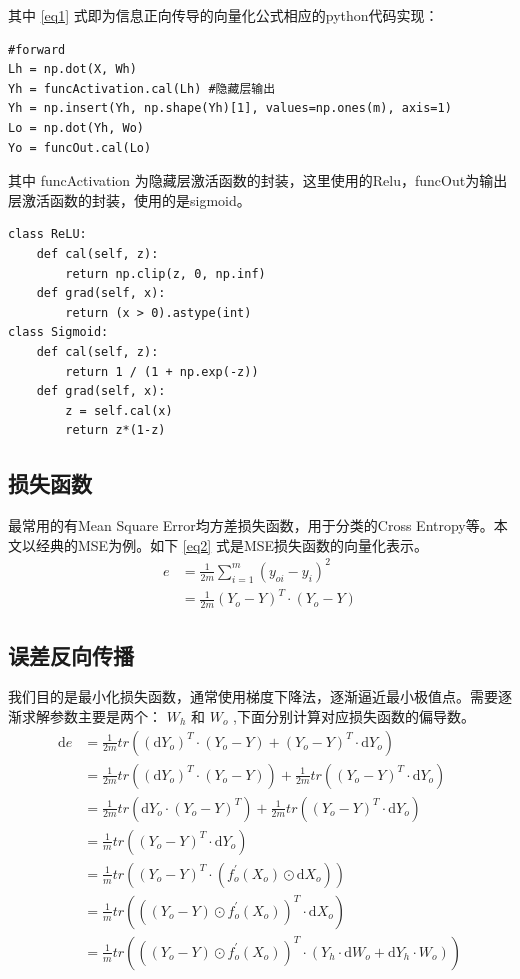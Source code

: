 \documentclass[12pt, a4paper, oneside]{ctexart}
\begin{document}
其中 \eqref{eq1} 式即为信息正向传导的向量化公式相应的python代码实现：

\begin{lstlisting}
#forward
Lh = np.dot(X, Wh)
Yh = funcActivation.cal(Lh) #隐藏层输出
Yh = np.insert(Yh, np.shape(Yh)[1], values=np.ones(m), axis=1)
Lo = np.dot(Yh, Wo)
Yo = funcOut.cal(Lo)
\end{lstlisting}

其中 funcActivation 为隐藏层激活函数的封装，这里使用的Relu，funcOut为输出层激活函数的封装，使用的是sigmoid。
\begin{lstlisting}
class ReLU:
    def cal(self, z):
        return np.clip(z, 0, np.inf)
    def grad(self, x):
        return (x > 0).astype(int)
class Sigmoid:
    def cal(self, z):
        return 1 / (1 + np.exp(-z))
    def grad(self, x):
        z = self.cal(x)
        return z*(1-z)
\end{lstlisting}

\subsection{损失函数}
最常用的有Mean Square Error均方差损失函数，用于分类的Cross Entropy等。本文以经典的MSE为例。如下 \eqref{eq2} 式是MSE损失函数的向量化表示。
\begin{align}
	e 	&= \frac{1}{2m}\sum_{i=1}^{m} (y_{oi} - y_i)^2 				\nonumber\\
		&= \frac{1}{2m}(Y_o - Y)^T \cdot (Y_o - Y)                  \label{eq2}	
\end{align}


\subsection{误差反向传播}

我们目的是最小化损失函数，通常使用梯度下降法，逐渐逼近最小极值点。需要逐渐求解参数主要是两个：
$W_h$ 和  $W_o$ ,下面分别计算对应损失函数的偏导数。
\begin{align}
\mathrm{d}e &= \frac{1}{2m}tr((\mathrm{d}Y_o)^T \cdot (Y_o - Y)  +  (Y_o - Y)^T \cdot \mathrm{d}Y_o)  \nonumber\\
	&= \frac{1}{2m}tr((\mathrm{d}Y_o)^T \cdot (Y_o - Y))  +  \frac{1}{2m}tr((Y_o - Y)^T \cdot \mathrm{d}Y_o)  \nonumber\\
	&= \frac{1}{2m}tr(\mathrm{d}Y_o \cdot (Y_o - Y)^T)  +  \frac{1}{2m}tr((Y_o - Y)^T \cdot \mathrm{d}Y_o)  \nonumber\\
	&= \frac{1}{m}tr((Y_o - Y)^T \cdot \mathrm{d}Y_o) \label{eq3} \\
	&= \frac{1}{m}tr((Y_o - Y)^T \cdot (f_o^{'}(X_o) \odot \mathrm{d}X_o)) \label{eq4} \\
	&= \frac{1}{m}tr(((Y_o - Y) \odot f_o^{'}(X_o))^T \cdot \mathrm{d}X_o) \label{eq5} \\
	&= \frac{1}{m}tr(((Y_o - Y) \odot f_o^{'}(X_o))^T \cdot (Y_h \cdot \mathrm{d}W_o + \mathrm{d}Y_h \cdot W_o))  \label{eq6}
\end{align}
\end{document}
